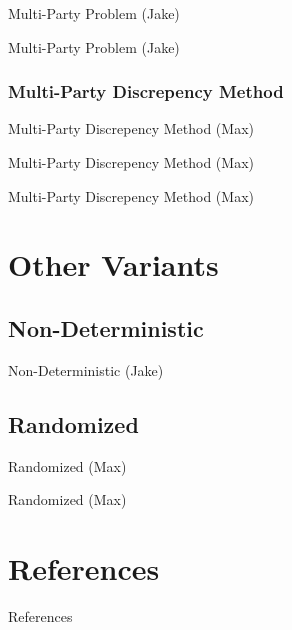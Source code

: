 \documentclass{beamer}
\begin{document}
\begin{frame}{Multi-Party Problem (Jake)}

\end{frame}

\begin{frame}{Multi-Party Problem (Jake)}

\end{frame}

\subsubsection{Multi-Party Discrepency Method}

\begin{frame}{Multi-Party Discrepency Method (Max)}

\end{frame}

\begin{frame}{Multi-Party Discrepency Method (Max)}

\end{frame}

\begin{frame}{Multi-Party Discrepency Method (Max)}

\end{frame}

\section{Other Variants}

\subsection{Non-Deterministic}

\begin{frame}{Non-Deterministic (Jake)}

\end{frame}

\subsection{Randomized}

\begin{frame}{Randomized (Max)}

\end{frame}

\begin{frame}{Randomized (Max)}

\end{frame}

\section{References}

\begin{frame}[t, allowframebreaks]{References}


\end{frame}
\end{document}
